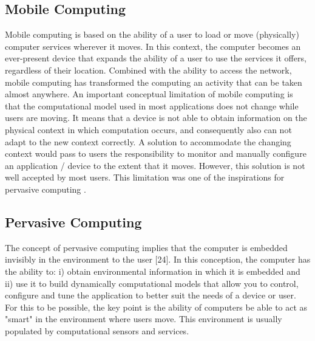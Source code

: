 \documentclass{acm_proc_article-sp}
\begin{document}
\subsection{Mobile Computing}
Mobile computing is based on the ability of a user to load or move (physically) computer services wherever it moves. In this context, the computer becomes an ever-present device that expands the ability of a user to use the services it offers, regardless of their location. Combined with the ability to access the network, mobile computing has transformed the computing an activity that can be taken almost anywhere.
\newline
\newline
An important conceptual limitation of mobile computing is that the computational model used in most applications does not change while users are moving. It means that a device is not able to obtain information on the physical context in which computation occurs, and consequently also can not adapt to the new context correctly. A solution to accommodate the changing context would pass to users the responsibility to monitor and manually configure an application / device to the extent that it moves. However, this solution is not well accepted by most users. This limitation was one of the inspirations for pervasive computing .

\subsection{Pervasive Computing}
The concept of pervasive computing implies that the computer is embedded invisibly in the environment to the user [24]. In this conception, the computer has the ability to: i) obtain environmental information in which it is embedded and ii) use it to build dynamically computational models that allow you to control, configure and tune the application to better suit the needs of a device or user. For this to be possible, the key point is the ability of computers be able to act as "smart" in the environment where users move. This environment is usually populated by computational sensors and services.
\end{document}
